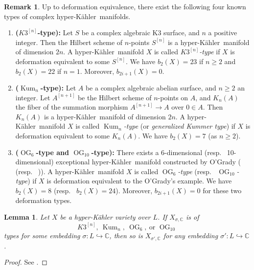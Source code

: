 \documentclass[12pt,reqno]{amsart}
\newtheorem{lem}[thm]{Lemma}
\theoremstyle{definition}
\newtheorem{rem}[thm]{Remark}
\newcommand{\C}{{\mathds C}}
\newcommand{\hk}{hyper-Kähler~}
\newcommand\Kum{\mathop{\mathrm{Kum}}\nolimits}
\newcommand\OG{\mathop{\mathrm{OG}}\nolimits}
\numberwithin{equation}{section}
\begin{document}
\begin{rem}
\label{rem:types}
Up to deformation equivalence, there exist the following four known types of complex \hk manifolds.
\begin{enumerate}
    \item{\bf($K3^{[n]}$-type):}
    Let $S$ be a complex algebraic K3 surface, and $n$ a positive integer.
    Then the Hilbert scheme of $n$-points $S^{[n]}$ is a \hk manifold of dimension $2n$.
    A \hk manifold $X$ is called \emph{$K3^{[n]}$-type} if $X$ is deformation equivalent to some $S^{[n]}$. We have $b_2(X) = 23$ if $n \geq 2$ and $b_2(X) = 22$ if $n = 1$. Moreover, $b_{2i+1}(X) =0$.
    \item{\bf($\Kum_{n}$-type):}
    Let $A$ be a complex algebraic abelian surface, %
    and $n\geq 2$ an integer.
    Let $A^{[n+1]}$ be the Hilbert scheme of $n$-points on $A$, and $K_{n}(A)$ the fiber of the summation morphism
    $A^{[n+1]} \rightarrow A$ over $0 \in A$.
    Then $K_{n} (A)$ is a \hk manifold of dimension $2n$.
    A \hk manifold $X$ is called \emph{$\Kum_{n}$-type} (or \emph{generalized Kummer type}) if $X$ is deformation equivalent to some $K_{n}(A)$.
    We have $b_2(X) = 7$ (as $n \geq 2$).
    \item{\bf($\OG_6$-type and $\OG_{10}$-type):}
    There exists a 6-dimensional (resp.~ 10-dimensional) exceptional \hk manifold constructed by O'Grady (\cite{OG6} (resp.~ \cite{OG10})).
    A \hk manifold $X$ is called \emph{$\OG_6$-type} (resp.~ \emph{$\OG_{10}$-type}) if $X$ is deformation equivalent to the O'Grady's example. We have $b_2(X) = 8$ (resp.~ $b_2(X) = 24$).
    Moreover, $b_{2i+1}(X) =0$ for these two deformation types.
\end{enumerate}
\end{rem}


\begin{lem}\label{lem:Deformation Types Stable Geometric Invariance}
	Let $X$ be a hyper-Kähler variety over $L$.
    If $X_{\sigma,\C}$ is of
    \begin{equation}\label{eq:KnownTypes}
    \tag{$\star$}
        K3^{[n]},~\Kum_{n},~\OG_6, \ \text{or } \OG_{10}
    \end{equation}
     types for some embedding $\sigma \colon L \hookrightarrow \C$, then so is $X_{\sigma',\C}$ for any embedding $\sigma' \colon L \hookrightarrow \C$.
\end{lem}
\begin{proof}
	See \cite[Proposition 2.3]{FLTZ22}.
\end{proof}
\end{document}
